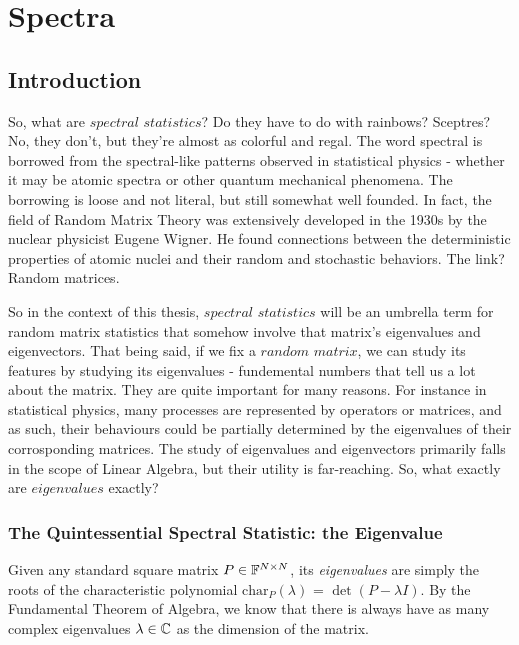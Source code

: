 
\chapter{Spectra}

\section{Introduction}
So, what are $\textit{spectral statistics}$? Do they have to do with rainbows? Sceptres? No, they don’t, but they’re almost as colorful and regal. The word spectral is borrowed from the spectral-like patterns observed in statistical physics - whether it may be atomic spectra or other quantum mechanical phenomena. The borrowing is loose and not literal, but still somewhat well founded. In fact, the field of Random Matrix Theory was extensively developed in the 1930s by the nuclear physicist Eugene Wigner. He found connections between the deterministic properties of atomic nuclei and their random and stochastic behaviors. The link? Random matrices.

So in the context of this thesis, $\textit{spectral statistics}$ will be an umbrella term for random matrix statistics that somehow involve that matrix's eigenvalues and eigenvectors. That being said, if we fix a $\textit{random matrix}$, we can study its features by studying its eigenvalues - fundemental numbers that tell us a lot about the matrix. They are quite important for many reasons. For instance in statistical physics, many processes are represented by operators or matrices, and as such, their behaviours could be partially determined by the eigenvalues of their corrosponding matrices. The study of eigenvalues and eigenvectors primarily falls in the scope of Linear Algebra, but their utility is far-reaching. So, what exactly are $\textit{eigenvalues}$ exactly?


\subsection{The Quintessential Spectral Statistic: the Eigenvalue}
Given any standard square matrix $P \in \mathbb{F}^{N \times N}$, its \textit{eigenvalues} are simply the roots of the characteristic polynomial $\text{char}_P{(\lambda)}$ = $\det(P - \lambda I)$. By the Fundamental Theorem of Algebra, we know that there is always have as many complex eigenvalues $\lambda \in \mathbb{C}$ as the dimension of the matrix. 


